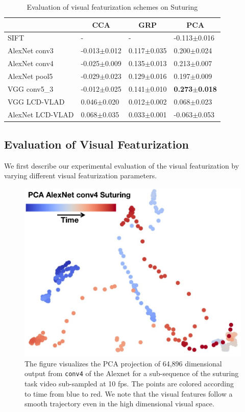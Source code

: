 \begin{table}[t!]
\centering
\caption{Evaluation of visual featurization schemes on Suturing}
\label{tab:visual}
\begin{tabular}{l|l|l|l}
\hline
\rowcolor[HTML]{CBCEFB} 
                 & \multicolumn{1}{c|}{CCA}           & \multicolumn{1}{c|}{GRP}          & \multicolumn{1}{c}{PCA}           \\ \hline \hline
SIFT             &          -     &        -     & -0.113$\pm$0.016 \\ %
\rowcolor[HTML]{E0E0E0} 
AlexNet conv3    & -0.013$\pm$0.012 & 0.117$\pm$0.035 & 0.200$\pm$0.024 \\ %
AlexNet conv4    & -0.025$\pm$0.009 & 0.135$\pm$0.013 & 0.213$\pm$0.007  \\ %
\rowcolor[HTML]{E0E0E0} 
AlexNet pool5    & -0.029$\pm$0.023 & 0.129$\pm$0.016 & 0.197$\pm$0.009  \\ %
VGG conv5\_3     & -0.012$\pm$0.025 & 0.141$\pm$0.010 & \textbf{0.273$\pm$0.018}  \\ %
\rowcolor[HTML]{E0E0E0} 
VGG LCD-VLAD     & 0.046$\pm$0.020  & 0.012$\pm$0.002 & 0.068$\pm$0.023  \\ %
AlexNet LCD-VLAD & 0.068$\pm$0.035  & 0.033$\pm$0.001 & -0.063$\pm$0.053 \\
\hline
\end{tabular}
\vspace{-15pt}
\end{table}

\subsection{Evaluation of Visual Featurization}
We first describe our experimental evaluation of the visual featurization by varying different visual featurization parameters.

\begin{figure}[ht!]
\centering
\includegraphics[width=0.7\linewidth]{figures/pca_conv4.png}
\caption{The figure visualizes the PCA projection of 64,896 dimensional output from \texttt{conv4} of the Alexnet for a sub-sequence of the suturing task video sub-sampled at 10 fps. The points are colored according to time from blue to red. We note that the visual features follow a smooth trajectory even in the high dimensional visual space.   \label{fig:imgtraj}}
\vspace{-10pt}
\end{figure}


